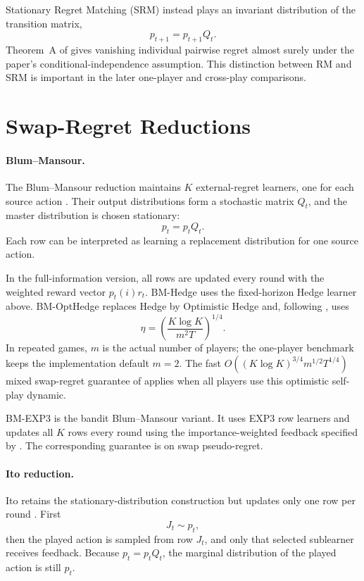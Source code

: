 Stationary Regret Matching (SRM) instead plays an invariant distribution of
the transition matrix,
\[
    p_{t+1}=p_{t+1}Q_t.
\]
Theorem~A of \citet{hart_simple_2000} gives vanishing individual pairwise
regret almost surely under the paper's conditional-independence assumption.
This distinction between RM and SRM is important in the later one-player and
cross-play comparisons.

\section{Swap-Regret Reductions}

\paragraph{Blum--Mansour.}

The Blum--Mansour reduction maintains \(K\) external-regret learners, one for
each source action \citep{blum_external_2007}. Their output distributions form
a stochastic matrix \(Q_t\), and the master distribution is chosen stationary:
\[
    p_t=p_tQ_t.
\]
Each row can be interpreted as learning a replacement distribution for one
source action.

In the full-information version, all rows are updated every round with the
weighted reward vector \(p_t(i)r_t\). BM-Hedge uses the fixed-horizon Hedge
learner above. BM-OptHedge replaces Hedge by Optimistic Hedge and, following
\citet{chen_hedging_2020}, uses
\[
    \eta=
    \left(\frac{K\log K}{m^2T}\right)^{1/4}.
\]
In repeated games, \(m\) is the actual number of players; the one-player
benchmark keeps the implementation default \(m=2\). The fast
\(O((K\log K)^{3/4}m^{1/2}T^{1/4})\) mixed swap-regret guarantee of
\citet{chen_hedging_2020} applies when all players use this optimistic
self-play dynamic.

BM-EXP3 is the bandit Blum--Mansour variant. It uses EXP3 row learners and
updates all \(K\) rows every round using the importance-weighted feedback
specified by \citet{blum_external_2007}. The corresponding guarantee is on
swap pseudo-regret.

\paragraph{Ito reduction.}

Ito retains the stationary-distribution construction but updates only one row
per round \citep{ito_tight_2020}. First
\[
    J_t\sim p_t,
\]
then the played action is sampled from row \(J_t\), and only that selected
sublearner receives feedback. Because \(p_t=p_tQ_t\), the marginal
distribution of the played action is still \(p_t\).

